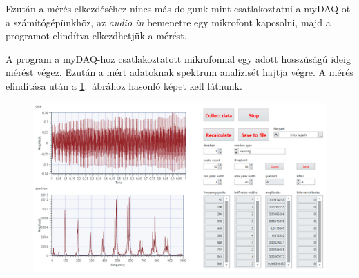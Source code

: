 \documentclass[a4paper,12pt]{article}
\begin{document}
Ezután a mérés elkezdéséhez nincs más dolgunk mint csatlakoztatni a myDAQ-ot a számítógépünkhöz, az \textit{audio in} bemenetre egy mikrofont kapcsolni, majd a programot elindítva elkezdhetjük a mérést.

A program a myDAQ-hoz csatlakoztatott mikrofonnal egy adott hosszúságú ideig mérést végez. Ezután a mért adatoknak spektrum analízisét hajtja végre. A mérés elindítása után a \ref{labview}.\ ábrához hasonló képet kell látnunk.

\begin{figure}[h]
\includegraphics[width=\textwidth]{labview.png}
\caption{}
\label{labview}
\end{figure}
\end{document}
